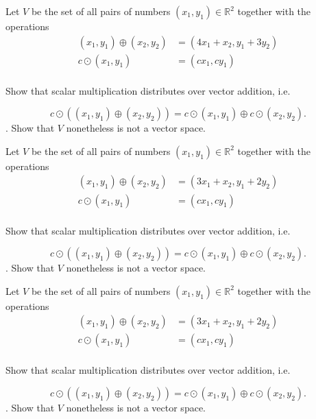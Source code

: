 \documentclass{article}
\begin{document}
\begin{exerciseStatement}
    Let \(V\) be the set of all pairs of numbers \((x_1,y_1)\in\mathbb{R}^2\)  together with the operations
\begin{align*}
(x_1,y_1)\oplus (x_2,y_2)&= (4x_1+x_2, y_1+3y_2)\\
c \odot (x_1,y_1) &= (cx_1,cy_1)\\
\end{align*}

Show that scalar multiplication distributes over vector addition, i.e.

\[c\odot \left((x_1,y_1)\oplus(x_2,y_2)\right)=c\odot(x_1,y_1)\oplus c\odot(x_2,y_2).\]
.
Show that \(V\) nonetheless is not a vector space.



  
\end{exerciseStatement}

\begin{exerciseStatement}
    Let \(V\) be the set of all pairs of numbers \((x_1,y_1)\in\mathbb{R}^2\)  together with the operations
\begin{align*}
(x_1,y_1)\oplus (x_2,y_2)&= (3x_1+x_2, y_1+2y_2)\\
c \odot (x_1,y_1) &= (cx_1,cy_1)\\
\end{align*}

Show that scalar multiplication distributes over vector addition, i.e.

\[c\odot \left((x_1,y_1)\oplus(x_2,y_2)\right)=c\odot(x_1,y_1)\oplus c\odot(x_2,y_2).\]
.
Show that \(V\) nonetheless is not a vector space.



  
\end{exerciseStatement}

\begin{exerciseStatement}
    Let \(V\) be the set of all pairs of numbers \((x_1,y_1)\in\mathbb{R}^2\)  together with the operations
\begin{align*}
(x_1,y_1)\oplus (x_2,y_2)&= (3x_1+x_2, y_1+2y_2)\\
c \odot (x_1,y_1) &= (cx_1,cy_1)\\
\end{align*}

Show that scalar multiplication distributes over vector addition, i.e.

\[c\odot \left((x_1,y_1)\oplus(x_2,y_2)\right)=c\odot(x_1,y_1)\oplus c\odot(x_2,y_2).\]
.
Show that \(V\) nonetheless is not a vector space.



  
\end{exerciseStatement}
\end{document}
